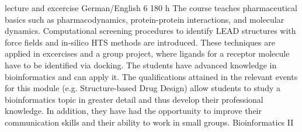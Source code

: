 {lecture and excercise}
{German/English}
{6}
{180 h}
{The course teaches pharmaceutical basics such as pharmacodynamics, protein-protein interactions, and molecular dynamics. Computational screening procedures to identify LEAD structures with force fields and in-silico HTS methods are introduced. These techniques are applied in excercises and a group project, where ligands for a receptor molecule have to be identified via docking.}
{The students have advanced knowledge in bioinformatics and can apply it. The qualifications attained in the relevant events for this module (e.g. Structure-based Drug Design) allow students to study a bioinformatics topic in greater detail and thus develop their professional knowledge. In addition, they have had the opportunity to improve their communication skills and their ability to work in small groups.}
{Bioinformatics II}